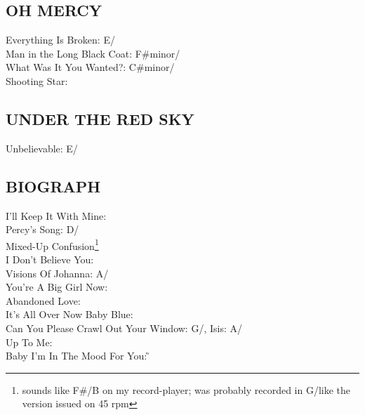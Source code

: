 \documentclass[a4paper,twoside]{memoir}
\begin{document}
\subsection{OH MERCY}
Everything Is Broken: E/\A\\ Man in the Long Black Coat: F\#minor/\A\\ What Was It You Wanted?: C\#minor/\E\\ Shooting Star: \E


\subsection{UNDER THE RED SKY}
Unbelievable: E/\A


\subsection{BIOGRAPH}
I'll Keep It With Mine: \C\\ Percy's Song: D/\G\\ Mixed-Up Confusion\footnote{sounds like F\#/B on my
record-player; was probably recorded in G/\C like the version issued
on 45 rpm}\\ I Don't Believe You: \E\\ Visions Of Johanna: A/\D\\ You're A Big Girl Now: \E\\ Abandoned Love: \G\\ It's All Over Now Baby Blue: \D\\ Can You Please Crawl Out Your Window: G/\C,
Isis: A/\D\\ Up To Me: \E\\ Baby I'm In The Mood For You: \G
\end{document}
